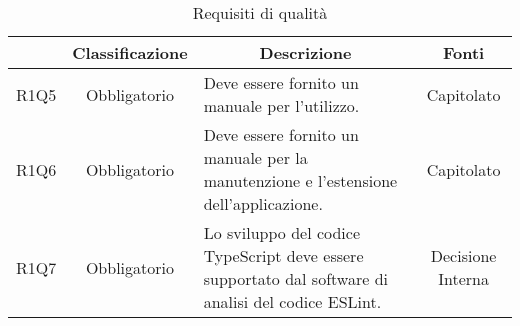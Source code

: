 \begin{table}[H]
    \centering
    \renewcommand{\arraystretch}{1.8}
    \begin{tabular}{c | c | p{6cm} | c}
        \rowcolor[HTML]{125E28}
        \multicolumn{1}{c}{\color[HTML]{FFFFFF} \textbf{Codice}}          &
        \multicolumn{1}{c}{\color[HTML]{FFFFFF} \textbf{Classificazione}} &
        \multicolumn{1}{c}{\color[HTML]{FFFFFF} \textbf{Descrizione}}     &
        \multicolumn{1}{c}{\color[HTML]{FFFFFF} \textbf{Fonti}}                                                                                                                                                                   \\
        \hline
        R1Q5                                                              & Obbligatorio & Deve essere fornito un manuale per l'utilizzo.                                                                  & Capitolato        \\
        R1Q6                                                              & Obbligatorio & Deve essere fornito un manuale per la manutenzione e l'estensione dell'applicazione.                            & Capitolato        \\
        R1Q7                                                              & Obbligatorio & Lo sviluppo del codice TypeScript\glo{} deve essere supportato dal software di analisi del codice ESLint\glo{}. & Decisione Interna \\
    \end{tabular}
    \caption{Requisiti di qualità}
\end{table}

